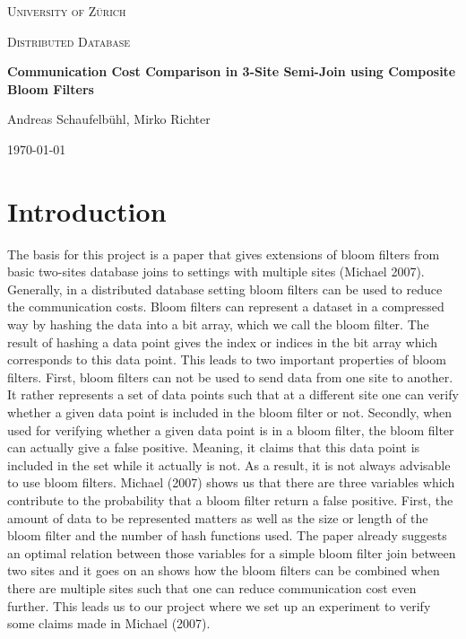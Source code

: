 \documentclass[12]{scrartcl}
\begin{document}
\begin{titlepage}
	\centering
	{\scshape\LARGE University of Zürich\par}
	\vspace{1cm}
	{\scshape\Large Distributed Database\par}
	\vspace{1.5cm}
	{\huge\bfseries Communication Cost Comparison in 3-Site Semi-Join using Composite Bloom Filters\par}
	\vspace{2cm}
	{\Large Andreas Schaufelbühl, Mirko Richter\par}
	\vfill
	
	{\large \today\par}
\end{titlepage}

	
\section{Introduction}
The basis for this project is a paper that gives extensions of bloom filters from basic two-sites database joins to settings with multiple sites (Michael 2007). Generally, in a distributed database setting bloom filters can be used to reduce the communication costs. Bloom filters can represent a dataset in a compressed way by hashing the data into a bit array, which we call the bloom filter. The result of hashing a data point gives the index or indices in the bit array which corresponds to this data point. This leads to two important properties of bloom filters. First, bloom filters can not be used to send data from one site to another. It rather represents a set of data points such that at a different site one can verify whether a given data point is included in the bloom filter or not. Secondly, when used for verifying whether a given data point is in a bloom filter, the bloom filter can actually give a false positive. Meaning, it claims that this data point is included in the set while it actually is not. As a result, it is not always advisable to use bloom filters. Michael (2007) shows us that there are three variables which contribute to the probability that a bloom filter return a false positive. First, the amount of data to be represented matters as well as the size or length of the bloom filter and the number of hash functions used. The paper already suggests an optimal relation between those variables for a simple bloom filter join between two sites and it goes on an shows how the bloom filters can be combined when there are multiple sites such that one can reduce communication cost even further. This leads us to our project where we set up an experiment to verify some claims made in Michael (2007).
\end{document}
